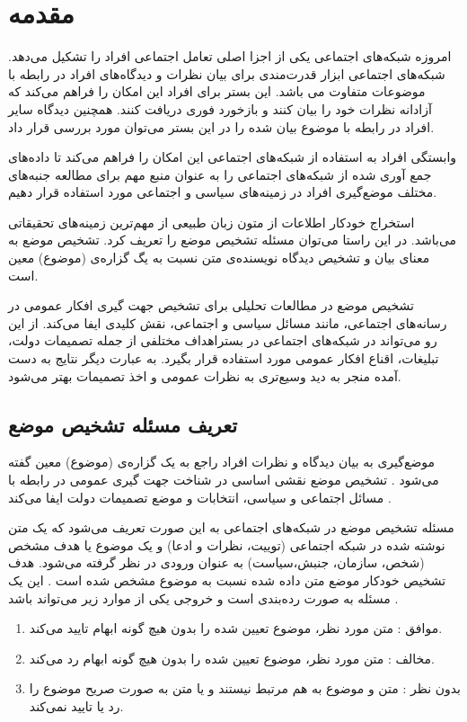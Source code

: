 \chapter{مقدمه}
\thispagestyle{empty}
امروزه شبکە‌های اجتماعی یکی از اجزا اصلی تعامل اجتماعی افراد را تشکیل می‌دهد. شبکه‌‌های اجتماعی ابزار قدرت‌مندی برای بیان نظرات و دیدگاە‌های افراد در رابطه با موضوعات متفاوت می‌ باشد. این بستر برای افراد این امکان را فراهم می‌کند که آزادانه نظرات خود را بیان کنند و بازخورد فوری دریافت کنند. همچنین دیدگاه سایر افراد در رابطه با موضوع بیان شده را در این بستر می‌توان مورد بررسی قرار داد.


وابستگی افراد به استفاده از شبکه‌‌های اجتماعی این امکان را فراهم می‌کند تا دادە‌های جمع آوری شده از شبکه‌های اجتماعی را به عنوان منبع مهم برای مطالعه جنبە‌های مختلف موضع‌گیری افراد در زمینە‌های سیاسی و اجتماعی مورد استفاده قرار دهیم.


استخراج خودکار اطلاعات از متون زبان طبیعی از مهم‌ترین زمینە‌های تحقیقاتی می‌باشد. در این راستا می‌توان مسئله تشخیص موضع
 را تعریف کرد. تشخیص موضع به معنای بیان و تشخیص دیدگاه نویسندە‌ی متن نسبت به یگ گزاره‌ی (موضوع) معین است.

تشخیص موضع در مطالعات تحلیلی برای تشخیص جهت گیری افکار عمومی در رسانە‌های اجتماعی، مانند مسائل سیاسی و اجتماعی، نقش کلیدی ایفا می‌کند. از این رو می‌تواند در شبکە‌های اجتماعی در بستراهداف مختلفی از جمله تصمیمات دولت، تبلیغات، اقناع افکار عمومی مورد استفاده قرار بگیرد. به عبارت دیگر نتایج به دست آمده منجر به دید وسیع‌تری به نظرات عمومی و اخذ تصمیمات بهتر می‌شود.
\section{تعریف مسئله تشخیص موضع}
موضع‌گیری
به بیان دیدگاه و نظرات افراد راجع به یک گزارە‌ی (موضوع) معین گفته می‌شود
\cite{hardalov-etal-2022-survey}.
تشخیص موضع
نقشی اساسی در شناخت جهت گیری عمومی در رابطه با مسائل اجتماعی و سیاسی، انتخابات و
موضع تصمیمات دولت ایفا می‌کند
\cite{ALDAYEL2021102597, 10.1145/3209542.3209549}.


مسئله تشخیص موضع در شبکه‌های اجتماعی به این صورت تعریف می‌شود که یک متن نوشته شده
در شبکه اجتماعی (توییت، نظرات و ادعا) و یک موضوع یا هدف مشخص
(شخص، سازمان، جنبش،سیاست) به عنوان ورودی در نظر گرفته می‌شود. هدف تشخیص خودکار موضع متن داده شده نسبت به موضوع مشخص شده است
\cite{ALDAYEL2021102597}.
این یک مسئله به صورت ردە‌بندی است و خروجی یکی از موارد زیر می‌تواند باشد
\cite{li-caragea-2019-multi}.
\begin{enumerate}
	\setlength\itemsep{-0.4em}
	\item موافق
	:
	متن مورد نظر، موضوع تعیین شده را بدون هیچ گونه ابهام تایید می‌کند.
	\item مخالف
	:
	متن مورد نظر، موضوع تعیین شده را بدون هیچ گونه ابهام رد می‌کند.
	\item بدون نظر
	:
	متن و موضوع به هم مرتبط نیستند و یا متن به صورت صریح موضوع را رد یا تایید نمی‌کند.
	
\end{enumerate}

